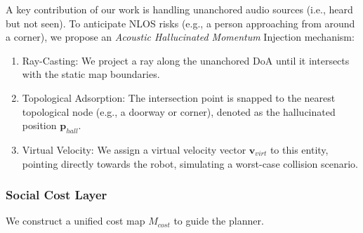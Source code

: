 A key contribution of our work is handling unanchored audio sources
(i.e., heard but not seen). To anticipate NLOS risks (e.g., a person
approaching from around a corner), we propose an \textit{Acoustic Hallucinated Momentum}
Injection mechanism:

\begin{enumerate}
    \def\labelenumi{\arabic{enumi}.}
    \item
          Ray-Casting: We project a ray along the unanchored DoA until it
          intersects with the static map boundaries.
    \item
          Topological Adsorption: The intersection point is snapped to the
          nearest topological node (e.g., a doorway or corner), denoted as the
          hallucinated position \(\mathbf{p}_{hall}\).
    \item
          Virtual Velocity: We assign a virtual velocity vector
          \(\mathbf{v}_{virt}\) to this entity, pointing directly towards the
          robot, simulating a worst-case collision scenario.
\end{enumerate}

\subsubsection{Social Cost Layer}\label{social-cost-layer}

We construct a unified cost map \(M_{cost}\) to guide the planner.

